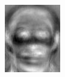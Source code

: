 \begin{frame}
\begin{columns}
\begin{overlayarea}{\textwidth}{\textheight}
{\begin{minipage}[t]{0.15\textwidth}
          \includegraphics[width=\textwidth]{images/eig_docked_image/eig_10.jpeg}
        \end{minipage}
        \begin{minipage}[t]{0.15\textwidth}

\end{minipage}}
\end{overlayarea}
\end{columns}
\end{frame}
